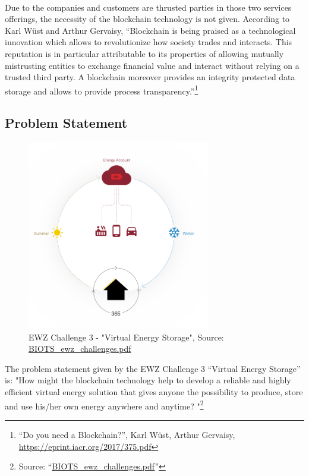 \documentclass{scrartcl}
\begin{document}
	\paragraph{}
	Due to the companies and customers are thrusted parties in those two services offerings, the necessity of the blockchain technology is not given. According to Karl Wüst and Arthur Gervaisy, “Blockchain is being praised as a technological innovation which allows to revolutionize how society trades and interacts. This reputation is in particular attributable to its properties of allowing mutually mistrusting entities to exchange financial value and interact without relying on a trusted third party. A blockchain moreover provides an integrity protected data storage and allows to provide process transparency.”\footnote{“Do you need a Blockchain?”, Karl Wüst, Arthur Gervaisy, \url{https://eprint.iacr.org/2017/375.pdf}}
	
	\subsection{Problem Statement}
	
	\begin{figure} [h!]
		\centering
		\includegraphics[width=80mm,scale=0.5]{01_introduction_picture02.PNG}
		\caption{EWZ Challenge 3 - "Virtual Energy Storage", Source: \url{BIOTS_ewz_challenges.pdf}}
	\end{figure}
	
	The problem statement given by the EWZ Challenge 3 “Virtual Energy Storage” is: "How might the blockchain technology help to develop a reliable and highly efficient virtual energy solution that gives anyone the possibility to produce, store and use his/her own energy anywhere and anytime? "\footnote{Source: “\url{BIOTS_ewz_challenges.pdf}”}
	
\end{document}
